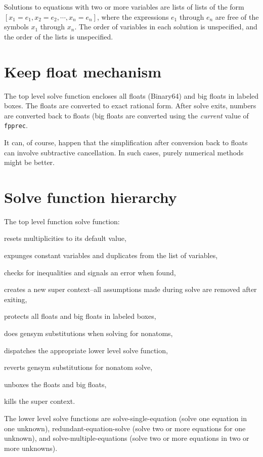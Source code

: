\documentclass[]{scrartcl}
\newcommand{\fpprec}{\texttt{fpprec}}
\begin{document}
Solutions to equations with two or more variables are lists of lists of the form \([x_1 = e_1, x_2 = e_2,
\cdots, x_n = e_n] \), where the expressions \(e_1\) through \(e_n\) are free of the symbols \(x_1\)
through \(x_n \). The order of variables in each solution is unspecified, and the order of the lists is
unspecified.

\section{Keep float mechanism}

The top level solve function encloses all floats (Binary64) and big floats in labeled boxes. The floats are converted to exact rational form.
After solve exits, numbers are converted back to floats (big floats are converted using the \emph{current} value of \fpprec.

It can, of course, happen that the simplification after conversion back to floats can involve subtractive cancellation. In such cases, purely numerical methods might be better.

\section{Solve function hierarchy}

 The top level function solve function:
 \begin{alphalist}[]
   \item resets multiplicities to its default value,
   \item expunges constant variables and duplicates from the list of variables,
   \item checks for inequalities and signals an error when found,
   \item creates a new super context--all assumptions made during solve are removed after exiting,
   \item protects all floats and big floats in labeled boxes,
   \item does gensym substitutions when solving for nonatoms,
   \item dispatches the appropriate lower level solve function,
   \item reverts gensym substitutions for nonatom solve,
   \item unboxes the floats and big floats,
   \item kills the super context.
\end{alphalist}

The lower level solve functions are solve-single-equation (solve one equation in one unknown), redundant-equation-solve (solve two or more equations for one unknown), and solve-multiple-equations (solve two or more equations in two or more unknowns).
\end{document}
